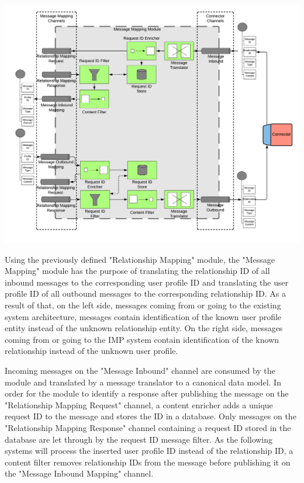 \begin{center}
    \includegraphics[scale=0.6]{Diagrams/Integration Architecture 1/Technological Integration/10. Message Mapping Module.pdf}
\end{center}

Using the previously defined "Relationship Mapping" module, the "Message Mapping" module has the purpose of translating the relationship ID of all inbound messages to the corresponding user profile ID and translating the user profile ID of all outbound messages to the corresponding relationship ID. As a result of that, on the left side, messages coming from or going to the existing system architecture, messages contain identification of the known user profile entity instead of the unknown relationship entity. On the right side, messages coming from or going to the IMP system contain identification of the known relationship instead of the unknown user profile.

Incoming messages on the "Message Inbound" channel are consumed by the module and translated by a message translator to a canonical data model. In order for the module to identify a response after publishing the message on the "Relationship Mapping Request" channel, a content enricher adds a unique request ID to the message and stores the ID in a database. Only messages on the "Relationship Mapping Response" channel containing a request ID stored in the database are let through by the request ID message filter. As the following systems will process the inserted user profile ID instead of the relationship ID, a content filter removes relationship IDs from the message before publishing it on the "Message Inbound Mapping" channel.


